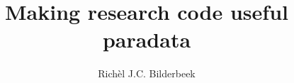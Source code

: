 \documentclass[graybox]{svmult}
\title{
  Making research code useful paradata
}
\author{Richèl J.C. Bilderbeek}
\begin{document}
\maketitle

\iffalse
\tableofcontents
\fi



\end{document}
